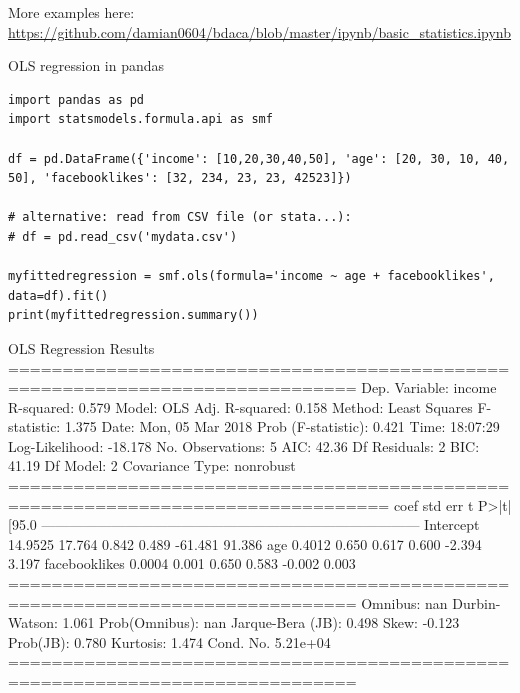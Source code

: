 \documentclass{beamer}
\begin{document}
\begin{frame}{}

More examples here: \url{https://github.com/damian0604/bdaca/blob/master/ipynb/basic_statistics.ipynb}
\end{frame}


\begin{frame}[fragile]{OLS regression in pandas}
\begin{lstlisting}
import pandas as pd
import statsmodels.formula.api as smf 

df = pd.DataFrame({'income': [10,20,30,40,50], 'age': [20, 30, 10, 40, 50], 'facebooklikes': [32, 234, 23, 23, 42523]})

# alternative: read from CSV file (or stata...):
# df = pd.read_csv('mydata.csv')

myfittedregression = smf.ols(formula='income ~ age + facebooklikes', data=df).fit()
print(myfittedregression.summary())
\end{lstlisting}
	
\end{frame}


\begin{frame}{}

\begin{lstlistingoutputtiny}
OLS Regression Results                            
==============================================================================
Dep. Variable:                 income   R-squared:                       0.579
Model:                            OLS   Adj. R-squared:                  0.158
Method:                 Least Squares   F-statistic:                     1.375
Date:                Mon, 05 Mar 2018   Prob (F-statistic):              0.421
Time:                        18:07:29   Log-Likelihood:                -18.178
No. Observations:                   5   AIC:                             42.36
Df Residuals:                       2   BIC:                             41.19
Df Model:                           2                                         
Covariance Type:            nonrobust                                         
=================================================================================
coef    std err          t      P>|t|      [95.0%
---------------------------------------------------------------------------------
Intercept        14.9525     17.764      0.842      0.489       -61.481    91.386
age               0.4012      0.650      0.617      0.600        -2.394     3.197
facebooklikes     0.0004      0.001      0.650      0.583        -0.002     0.003
==============================================================================
Omnibus:                          nan   Durbin-Watson:                   1.061
Prob(Omnibus):                    nan   Jarque-Bera (JB):                0.498
Skew:                          -0.123   Prob(JB):                        0.780
Kurtosis:                       1.474   Cond. No.                     5.21e+04
==============================================================================

\end{lstlistingoutputtiny}
	
\end{frame}
\end{document}
